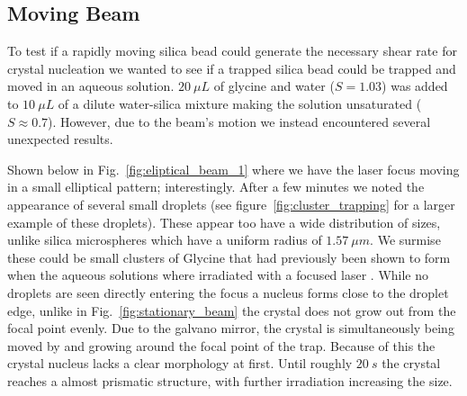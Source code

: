 \newpage
\subsection{Moving Beam}
\label{sec:moving}
To test if a rapidly moving silica bead could generate the necessary shear rate 
for crystal nucleation we wanted to see if a trapped silica bead could be trapped
and moved in an aqueous solution. $20\ \mu L$ of glycine and water ($S=1.03$) was 
added to $10\ \mu L$ of a dilute water-silica mixture making the solution 
unsaturated ($S\approx0.7$). However, due to the beam's motion we instead 
encountered several unexpected results. 

Shown below in Fig.~\ref{fig:eliptical_beam_1} where we have the laser focus 
moving in a small elliptical pattern; interestingly. After a few minutes we 
noted the appearance of several small droplets (see figure~\ref{fig:cluster_trapping}
for a larger example of these droplets). These appear too have a wide distribution
of sizes, unlike silica microspheres which have a uniform radius of $1.57\ 
\mu m$. We surmise these could be small clusters of Glycine that had previously 
been shown to form when the aqueous solutions where irradiated with a 
focused laser \cite{Tsuboi2009, Gowayed2021}. While no droplets are seen 
directly entering the focus a nucleus forms close to the droplet edge, 
unlike in Fig.~\ref{fig:stationary_beam} the crystal does not grow out from 
the focal point evenly. Due to the galvano mirror, the crystal is simultaneously 
being moved by and growing around the focal point of the trap. Because of 
this the crystal nucleus lacks a clear morphology at first. Until roughly 
$20\ s$ the crystal reaches a almost prismatic structure, with further 
irradiation increasing the size.
 
